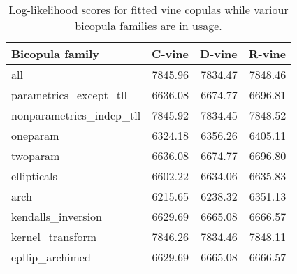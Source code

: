 \begin{table}[H]

\caption{Log-likelihood scores for fitted vine copulas while variour bicopula families are in usage.}
\centering
\fontsize{11}{13}\selectfont
\begin{tabular}[t]{lrrr}
\toprule
Bicopula family & C-vine & D-vine & R-vine\\
\midrule
all & 7845.96 & 7834.47 & 7848.46\\
parametrics\_except\_tll & 6636.08 & 6674.77 & 6696.81\\
nonparametrics\_indep\_tll & 7845.92 & 7834.45 & 7848.52\\
oneparam & 6324.18 & 6356.26 & 6405.11\\
twoparam & 6636.08 & 6674.77 & 6696.80\\
ellipticals & 6602.22 & 6634.06 & 6635.83\\
arch & 6215.65 & 6238.32 & 6351.13\\
kendalls\_inversion & 6629.69 & 6665.08 & 6666.57\\
kernel\_transform & 7846.26 & 7834.46 & 7848.11\\
epllip\_archimed & 6629.69 & 6665.08 & 6666.57\\
\bottomrule
\end{tabular}
\end{table}
